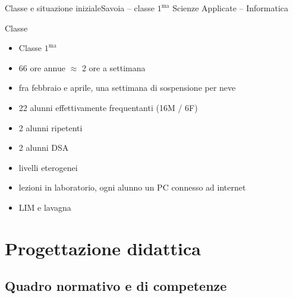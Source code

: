 \documentclass[italian]{beamer}
\begin{document}
\begin{frame}{Classe e situazione iniziale}{Savoia -- classe $1^{\text{ma}}$ Scienze Applicate -- Informatica}
	
	\begin{block}{Classe}
		\begin{itemize}
			\item Classe $1^{\text{ma}}$
			\item 66 ore annue $\approx$ 2 ore a settimana
			\item fra febbraio e aprile, una settimana di sospensione per neve
			\item 22 alunni effettivamente frequentanti (16M / 6F)
			\item 2 alunni ripetenti
			\item 2 alunni DSA
			\item livelli eterogenei
			\item lezioni in laboratorio, ogni alunno un PC connesso ad internet
			\item LIM e lavagna
		\end{itemize}
	\end{block}
	
\end{frame}

\section[Progettazione didattica]{Progettazione didattica}

\subsection[Norme e competenze]{Quadro normativo e di competenze}
\end{document}
